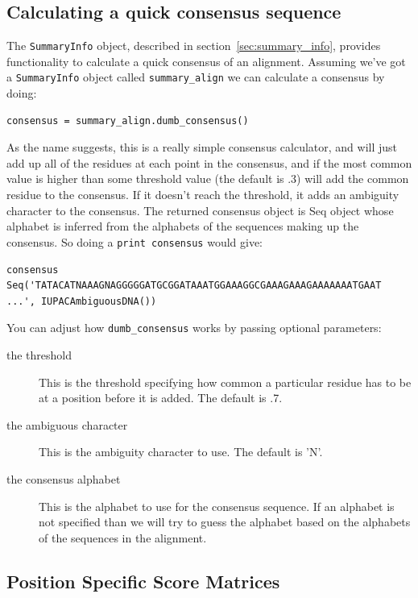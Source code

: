 \documentclass{report}
\begin{document}
\subsection{Calculating a quick consensus sequence}
\label{sec:consensus}

The \verb|SummaryInfo| object, described in section~\ref{sec:summary_info}, provides functionality to calculate a quick consensus of an alignment. Assuming we've got a \verb|SummaryInfo| object called \verb|summary_align| we can calculate a consensus by doing:

\begin{verbatim}
consensus = summary_align.dumb_consensus()
\end{verbatim}

As the name suggests, this is a really simple consensus calculator, and will just add up all of the residues at each point in the consensus, and if the most common value is higher than some threshold value (the default is .3) will add the common residue to the consensus. If it doesn't reach the threshold, it adds an ambiguity character to the consensus. The returned consensus object is Seq object whose alphabet is inferred from the alphabets of the sequences making up the consensus. So doing a \verb|print consensus| would give:

\begin{verbatim}
consensus Seq('TATACATNAAAGNAGGGGGATGCGGATAAATGGAAAGGCGAAAGAAAGAAAAAAATGAAT
...', IUPACAmbiguousDNA())
\end{verbatim}

You can adjust how \verb|dumb_consensus| works by passing optional parameters:

\begin{description}
\item[the threshold] This is the threshold specifying how common a particular residue has to be at a position before it is added. The default is .7.

\item[the ambiguous character] This is the ambiguity character to use. The default is 'N'.

\item[the consensus alphabet] This is the alphabet to use for the consensus sequence. If an alphabet is not specified than we will try to guess the alphabet based on the alphabets of the sequences in the alignment.
\end{description}

\subsection{Position Specific Score Matrices}
\label{sec:pssm}
\end{document}
